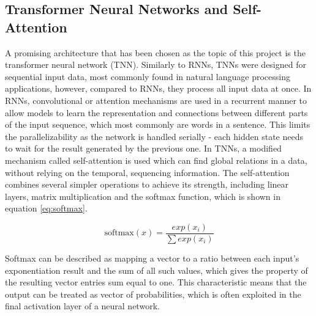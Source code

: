\subsection{Transformer Neural Networks and Self-Attention}\label{self-attention}
A promising architecture that has been chosen as the topic of this project is the transformer neural network (TNN). Similarly to RNNs, TNNs were designed for sequential input data, most commonly found in natural language processing applications, however, compared to RNNs, they process all input data at once. In RNNs, convolutional \cite{72-keren2016convolutional} or attention mechanisms \cite{71-chorowski2015attention-based} are used in a recurrent manner to allow models to learn the representation and connections between different parts of the input sequence, which most commonly are words in a sentence. This limits the parallelizability as the network is handled serially - each hidden state needs to wait for the result generated by the previous one. In TNNs, a modified mechanism called self-attention \cite{44-vaswani2017attention} is used which can find global relations in a data, without relying on the temporal, sequencing information. The self-attention combines several simpler operations to achieve its strength, including linear layers, matrix multiplication and the softmax function, which is shown in equation \ref{eq:softmax}.

\begin{equation}\label{eq:softmax}
  \text{softmax}(x) = \frac{exp(x_i)}{\sum exp(x_i)}
\end{equation}

Softmax can be described as mapping a vector to a ratio between each input's exponentiation result and the sum of all such values, which gives the property of the resulting vector entries sum equal to one. This characteristic means that the output can be treated as vector of probabilities, which is often exploited in the final activation layer of a neural network.

